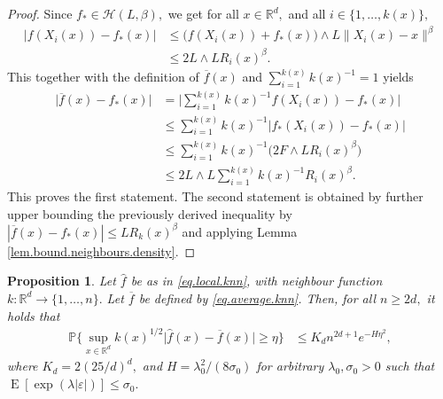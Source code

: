 \documentclass[10pt]{article}
\newcommand{\eps}{\varepsilon}
\newcommand{\mH}{\mathcal{H}}
\newcommand{\PP}{\mathbb{P}}
\newcommand{\RR}{\mathbb{R}}
\newcommand{\E}{\operatorname{E}}
\newcommand{\wh}{\widehat}
\newcommand{\ol}{\overline}
\newtheorem{proposition}[theorem]{Proposition}
\begin{document}
\begin{proof}
    Since $f_* \in \mH(L, \beta),$ we get for all $x \in \RR^d,$ and all $i \in \{1, \dots, k(x)\},$
    \begin{align*}
        \big|f(X_i(x)) - f_*(x)\big| &\leq \big(f(X_i(x)) + f_*(x)\big) \wedge L \|X_i(x) - x\|^{\beta}
        \nonumber\\
        &\leq 2L \wedge L R_i(x)^\beta.
    \end{align*}
    This together with the definition of $\ol f(x)$ and $\sum_{i=1}^{k(x)} k(x)^{-1} = 1$ yields 
    \begin{align*}
        \big|\ol f(x) - f_*(x) \big|
        &= \bigg|\sum_{i=1}^{k(x)} k(x)^{-1} f(X_i(x)) - f_*(x) \bigg|\\
        &\leq \sum_{i=1}^{k(x)} k(x)^{-1} \big|f_*(X_i(x)) - f_*(x) \big|\\
        &\leq \sum_{i=1}^{k(x)} k(x)^{-1}\big(2F \wedge L R_i(x)^\beta\big)\\
        &\leq 2L \wedge L \sum_{i=1}^{k(x)} k(x)^{-1} R_i(x)^\beta.
    \end{align*}
    This proves the first statement. The second statement is obtained by further upper bounding the previously derived inequality by $|\ol f(x) - f_*(x)| \leq LR_k(x)^\beta$ and applying Lemma \ref{lem.bound.neighbours.density}.
\end{proof}

\begin{proposition}\label{prop.variance.bound.general.case}
Let $\wh f$ be as in \eqref{eq.local.knn}, with neighbour function $k \colon \RR^d \to \{1, \dots, n\}.$ Let $\ol f$ be defined by \eqref{eq.average.knn}.
Then, for all $n\geq 2d,$ it holds that
\begin{align*}
    \PP\Bigg\{\sup_{x \in \RR^d}k(x)^{1/2}\big|\wh f(x) - \ol f(x)\big| \geq \eta\Bigg\} &\leq K_dn^{2d + 1}e^{-H \eta^2},
\end{align*}
where $K_d = 2(25/d)^d,$ and $H = \lambda_0^2/(8\sigma_0)$ for arbitrary $\lambda_0, \sigma_0 > 0$ such that $\E[\exp(\lambda|\eps|)] \leq \sigma_0.$
\end{proposition}
\end{document}
